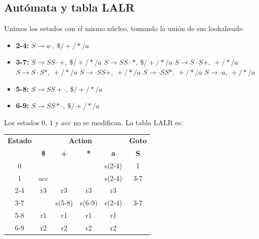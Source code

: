 \documentclass[12pt, letterpaper]{article}
\begin{document}
\begin{enumerate}
\subsection*{Autómata y tabla LALR}

Unimos los estados con el mismo núcleo, tomando la unión de sus lookaheads:
\begin{itemize}
    \item \textbf{2-4:} $S \to a\cdot,\ \$/+/*/a$
    \item \textbf{3-7:} $S \to SS\cdot +,\ \$/+/*/a$ \quad $S \to SS\cdot *,\ \$/+/*/a$ \quad $S \to S\cdot S+,\ +/*/a$ \quad $S \to S\cdot S*,\ +/*/a$ \quad $S \to \cdot SS+,\ +/*/a$ \quad $S \to \cdot SS*,\ +/*/a$ \quad $S \to \cdot a,\ +/*/a$
    \item \textbf{5-8:} $S \to SS+\cdot,\ \$/+/*/a$
    \item \textbf{6-9:} $S \to SS*\cdot,\ \$/+/*/a$
\end{itemize}
Los estados $0$, $1$ y $acc$ no se modifican. La tabla LALR es:

\begin{table}[H]
\centering
\begin{tabular}{c|cccc|c}
\toprule
\textbf{Estado} & \multicolumn{4}{c|}{\textbf{Action}} & \textbf{Goto} \\
& \textbf{\$} & \textbf{+} & \textbf{*} & \textbf{a} & \textbf{S} \\
\midrule
0 & & & & s(2-4) & 1 \\
1 & acc & & & s(2-4) & 3-7 \\
2-4 & r3 & r3 & r3 & r3 & \\
3-7 & & s(5-8) & s(6-9) & s(2-4) & 3-7 \\
5-8 & r1 & r1 & r1 & r1 & \\
6-9 & r2 & r2 & r2 & r2 & \\
\bottomrule
\end{tabular}
\end{table}

\end{enumerate}
\end{document}
